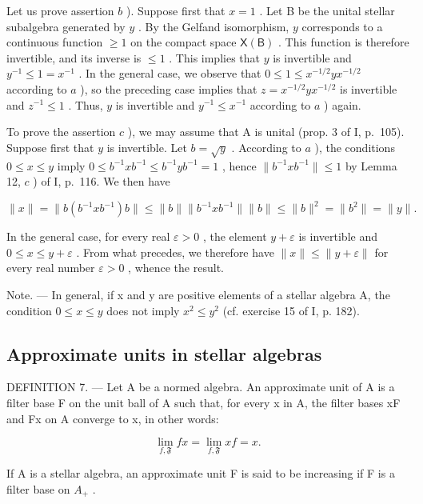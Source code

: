 Let us prove assertion \(b\) ). Suppose first that \(x = 1\) . Let B be the unital stellar subalgebra generated by \(y\) . By the Gelfand isomorphism, \(y\) corresponds to a continuous function \(\geqslant 1\) on the compact space \(\mathsf{X}(\mathsf{B})\) . This function is therefore invertible, and its inverse is \(\leqslant 1\) . This implies that \(y\) is invertible and \(y^{-1} \leqslant 1 = x^{-1}\) . In the general case, we observe that \(0 \leqslant 1 \leqslant x^{-1/2}yx^{-1/2}\) according to \(a\) ), so the preceding case implies that \(z = x^{-1/2}yx^{-1/2}\) is invertible and \(z^{-1} \leqslant 1\) . Thus, \(y\) is invertible and \(y^{-1} \leqslant x^{-1}\) according to \(a\) ) again.

To prove the assertion \(c\) ), we may assume that A is unital (prop. 3 of I, p.~105). Suppose first that \(y\) is invertible. Let \(b = \sqrt{y}\) . According to \(a\) ), the conditions \(0 \leqslant x \leqslant y\) imply \(0 \leqslant b^{-1}xb^{-1} \leqslant b^{-1}yb^{-1} = 1\) , hence \(\|b^{-1}xb^{-1}\| \leqslant 1\) by Lemma 12, \(c\) ) of I, p.~116. We then have

\[
\| x \| = \| b (b ^ {- 1} x b ^ {- 1}) b \| \leqslant \| b \| \| b ^ {- 1} x b ^ {- 1} \| \| b \| \leqslant \| b \| ^ {2} = \| b ^ {2} \| = \| y \|.
\]

In the general case, for every real \(\varepsilon > 0\) , the element \(y + \varepsilon\) is invertible and \(0 \leqslant x \leqslant y + \varepsilon\) . From what precedes, we therefore have \(\|x\| \leqslant \|y + \varepsilon\|\) for every real number \(\varepsilon > 0\) , whence the result.

Note. --- In general, if x and y are positive elements of a stellar algebra A, the condition \(0 \leqslant x \leqslant y\) does not imply \(x^{2} \leqslant y^{2}\) (cf. exercise 15 of I, p. 182).

\subsection{Approximate units in stellar algebras}

DEFINITION 7. --- Let A be a normed algebra. An approximate unit of A is a filter base F on the unit ball of A such that, for every x in A, the filter bases xF and Fx on A converge to x, in other words:

\[
\lim _ {f, \mathfrak {F}} f x = \lim _ {f, \mathfrak {F}} x f = x.
\]

If A is a stellar algebra, an approximate unit F is said to be increasing if F is a filter base on \(A_{+}\) .


